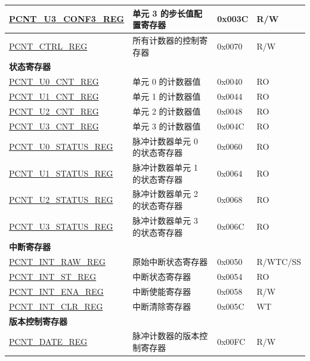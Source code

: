 \begin{longtable}{ | p{6cm} | p{7.2cm} | p{1.3cm} | p{1cm} | }
    \hyperref[regdesc:PCNTUNCONF3REG]{PCNT\_U3\_CONF3\_REG} & 单元 3 的步长值配置寄存器 & 0x003C & R/W \\ \hline
    \hyperref[regdesc:PCNTCTRLREG]{PCNT\_CTRL\_REG} & 所有计数器的控制寄存器 & 0x0070 & R/W \\ \hline
    \multicolumn{4}{|l|}{\textbf{状态寄存器}} \\ \hline
    \hyperref[regdesc:PCNTUNCNTREG]{PCNT\_U0\_CNT\_REG} & 单元 0 的计数器值 & 0x0040 & RO \\ \hline
    \hyperref[regdesc:PCNTUNCNTREG]{PCNT\_U1\_CNT\_REG} & 单元 1 的计数器值 & 0x0044 & RO \\ \hline
    \hyperref[regdesc:PCNTUNCNTREG]{PCNT\_U2\_CNT\_REG} & 单元 2 的计数器值 & 0x0048 & RO \\ \hline
    \hyperref[regdesc:PCNTUNCNTREG]{PCNT\_U3\_CNT\_REG} & 单元 3 的计数器值 & 0x004C & RO \\ \hline
    \hyperref[regdesc:PCNTUNSTATUSREG]{PCNT\_U0\_STATUS\_REG} & 脉冲计数器单元 0 的状态寄存器 & 0x0060 & RO \\ \hline
    \hyperref[regdesc:PCNTUNSTATUSREG]{PCNT\_U1\_STATUS\_REG} & 脉冲计数器单元 1 的状态寄存器 & 0x0064 & RO \\ \hline
    \hyperref[regdesc:PCNTUNSTATUSREG]{PCNT\_U2\_STATUS\_REG} & 脉冲计数器单元 2 的状态寄存器 & 0x0068 & RO \\ \hline
    \hyperref[regdesc:PCNTUNSTATUSREG]{PCNT\_U3\_STATUS\_REG} & 脉冲计数器单元 3 的状态寄存器 & 0x006C & RO \\ \hline
    \multicolumn{4}{|l|}{\textbf{中断寄存器}} \\ \hline
    \hyperref[regdesc:PCNTINTRAWREG]{PCNT\_INT\_RAW\_REG} & 原始中断状态寄存器 & 0x0050 & R/WTC/SS \\ \hline
    \hyperref[regdesc:PCNTINTSTREG]{PCNT\_INT\_ST\_REG} & 中断状态寄存器 & 0x0054 & RO \\ \hline
    \hyperref[regdesc:PCNTINTENAREG]{PCNT\_INT\_ENA\_REG} & 中断使能寄存器 & 0x0058 & R/W \\ \hline
    \hyperref[regdesc:PCNTINTCLRREG]{PCNT\_INT\_CLR\_REG} & 中断清除寄存器 & 0x005C & WT \\ \hline
    \multicolumn{4}{|l|}{\textbf{版本控制寄存器}} \\ \hline
    \hyperref[regdesc:PCNTDATEREG]{PCNT\_DATE\_REG} & 脉冲计数器的版本控制寄存器 & 0x00FC & R/W \\ \hline
    \end{longtable}

